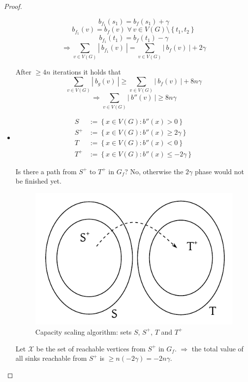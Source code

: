 \documentclass{article}
\newcommand{\card}[1]{\left|\:\!#1\:\!\right|}
\newcommand{\set}[1]{\left\{#1\right\}}
\newcommand{\fall}{\;\forall\,}
\begin{document}
\begin{proof}
\begin{itemize}
      \[ b_{f_1}(s_1) = b_{f}(s_1) + \gamma \]
      \[ b_{f_1}(v) = b_{f}(v) \fall v \in V(G) \setminus \set{t_1, t_2} \]
      \[ b_{f_1}(t_1) = b_{f}(t_1) - \gamma \]
      \[ \Rightarrow \sum_{v \in V(G)} \card{b_{f_1}(v)} = \sum_{v \in V(G)} \card{b_f(v)} + 2 \gamma \]

      After $\geq 4n$ iterations it holds that
      \[
        \sum_{v \in V(G)} \card{b_g(v)} \geq \sum_{v \in V(G)} \card{b_f(v)} + 8n\gamma
      \] \[
        \Rightarrow \sum_{v \in V(G)} \card{b''(v)} \geq 8n\gamma
      \]

    \item
      \begin{align*}
          S   &:= \set{x \in V(G): b''(x) > 0} \\
          S^+ &:= \set{x \in V(G): b''(x) \geq 2\gamma} \\
          T   &:= \set{x \in V(G): b''(x) < 0} \\
          T^+ &:= \set{x \in V(G): b''(x) \leq -2\gamma}
      \end{align*}

      Is there a path from $S^+$ to $T^+$ in $G_f$?
      No, otherwise the $2\gamma$ phase would not be finished yet.

      \begin{figure}[!ht]
        \begin{center}
          \includegraphics{img/capacity_scaling_algo_proof_sets.pdf}
          \caption{Capacity scaling algorithm: sets $S$, $S^+$, $T$ and $T^+$}
        \end{center}
      \end{figure}

      Let $\mathcal{X}$ be the set of reachable vertices from $S^+$ in $G_f$.
      $\Rightarrow$ the total value of all sinks reachable from $S^+$ is
      $\geq n (-2\gamma) = -2n\gamma$.


\end{itemize}
\end{proof}
\end{document}
